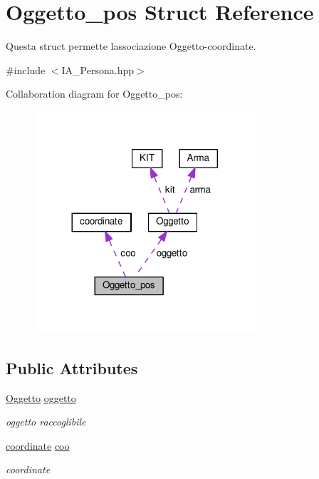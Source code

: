 \hypertarget{structOggetto__pos}{}\section{Oggetto\+\_\+pos Struct Reference}
\label{structOggetto__pos}


Questa struct permette l\textquotesingle{}associazione Oggetto-\/coordinate.  




{\ttfamily \#include $<$I\+A\+\_\+\+Persona.\+hpp$>$}



Collaboration diagram for Oggetto\+\_\+pos\+:\nopagebreak
\begin{figure}[H]
\begin{center}
\leavevmode
\includegraphics[width=233pt]{structOggetto__pos__coll__graph}
\end{center}
\end{figure}
\subsection*{Public Attributes}
\begin{DoxyCompactItemize}
\item 
\hypertarget{structOggetto__pos_acb0695ca7d62692637a184901d426464}{}\hyperlink{structOggetto}{Oggetto} \hyperlink{structOggetto__pos_acb0695ca7d62692637a184901d426464}{oggetto}\label{structOggetto__pos_acb0695ca7d62692637a184901d426464}

\begin{DoxyCompactList}\small\item\em oggetto raccoglibile \end{DoxyCompactList}\item 
\hypertarget{structOggetto__pos_aee7a056d2f9b14861f48c299d01eaf5f}{}\hyperlink{structcoordinate}{coordinate} \hyperlink{structOggetto__pos_aee7a056d2f9b14861f48c299d01eaf5f}{coo}\label{structOggetto__pos_aee7a056d2f9b14861f48c299d01eaf5f}

\begin{DoxyCompactList}\small\item\em coordinate \end{DoxyCompactList}\end{DoxyCompactItemize}


